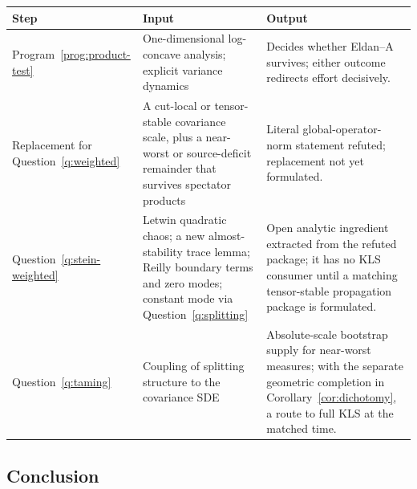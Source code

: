 \documentclass[../../main.tex]{subfiles}
\begin{document}
\begin{center}
\begin{tabularx}{\textwidth}{@{}>{\raggedright\arraybackslash}p{}>{\raggedright\arraybackslash}p{}Y@{}}
\toprule
Step & Input & Output \\
\midrule
Program~\ref{prog:product-test} & One-dimensional log-concave analysis; explicit variance
dynamics & Decides whether Eldan--A survives; either outcome redirects effort decisively. \\
\addlinespace
Replacement for Question~\ref{q:weighted} & A cut-local or tensor-stable covariance scale,
plus a near-worst or source-deficit remainder that survives spectator products & Literal
global-operator-norm statement refuted; replacement not yet formulated. \\
\addlinespace
Question~\ref{q:stein-weighted} & Letwin quadratic chaos; a new almost-stability trace lemma;
Reilly boundary terms and zero modes; constant mode via Question~\ref{q:splitting} & Open
analytic ingredient extracted from the refuted package; it has no KLS consumer until a matching
tensor-stable propagation package is formulated. \\
\addlinespace
Question~\ref{q:taming} & Coupling of splitting structure to the covariance SDE & Absolute-scale
bootstrap supply for near-worst measures; with the separate geometric completion in
Corollary~\ref{cor:dichotomy}, a route to full KLS at the matched time. \\
\bottomrule
\end{tabularx}
\end{center}

\subsection{Conclusion}
\end{document}
